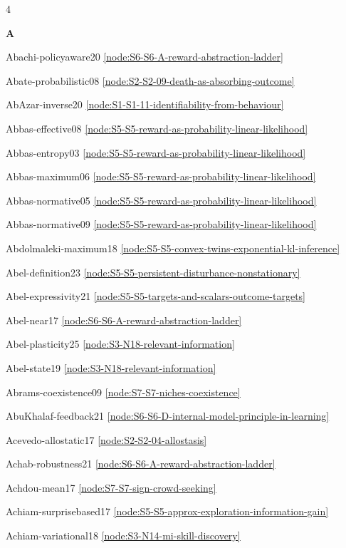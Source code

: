 \documentclass[10pt]{article}
\begin{document}
{\scriptsize\begin{multicols}{4}\raggedright

\smallskip\textbf{A}\par
Abachi-policyaware20 \hfill \ref{node:S6-S6-A-reward-abstraction-ladder}\par
Abate-probabilistic08 \hfill \ref{node:S2-S2-09-death-as-absorbing-outcome}\par
AbAzar-inverse20 \hfill \ref{node:S1-S1-11-identifiability-from-behaviour}\par
Abbas-effective08 \hfill \ref{node:S5-S5-reward-as-probability-linear-likelihood}\par
Abbas-entropy03 \hfill \ref{node:S5-S5-reward-as-probability-linear-likelihood}\par
Abbas-maximum06 \hfill \ref{node:S5-S5-reward-as-probability-linear-likelihood}\par
Abbas-normative05 \hfill \ref{node:S5-S5-reward-as-probability-linear-likelihood}\par
Abbas-normative09 \hfill \ref{node:S5-S5-reward-as-probability-linear-likelihood}\par
Abdolmaleki-maximum18 \hfill \ref{node:S5-S5-convex-twins-exponential-kl-inference}\par
Abel-definition23 \hfill \ref{node:S5-S5-persistent-disturbance-nonstationary}\par
Abel-expressivity21 \hfill \ref{node:S5-S5-targets-and-scalars-outcome-targets}\par
Abel-near17 \hfill \ref{node:S6-S6-A-reward-abstraction-ladder}\par
Abel-plasticity25 \hfill \ref{node:S3-N18-relevant-information}\par
Abel-state19 \hfill \ref{node:S3-N18-relevant-information}\par
Abrams-coexistence09 \hfill \ref{node:S7-S7-niches-coexistence}\par
AbuKhalaf-feedback21 \hfill \ref{node:S6-S6-D-internal-model-principle-in-learning}\par
Acevedo-allostatic17 \hfill \ref{node:S2-S2-04-allostasis}\par
Achab-robustness21 \hfill \ref{node:S6-S6-A-reward-abstraction-ladder}\par
Achdou-mean17 \hfill \ref{node:S7-S7-sign-crowd-seeking}\par
Achiam-surprisebased17 \hfill \ref{node:S5-S5-approx-exploration-information-gain}\par
Achiam-variational18 \hfill \ref{node:S3-N14-mi-skill-discovery}\par

\end{multicols}}
\end{document}
